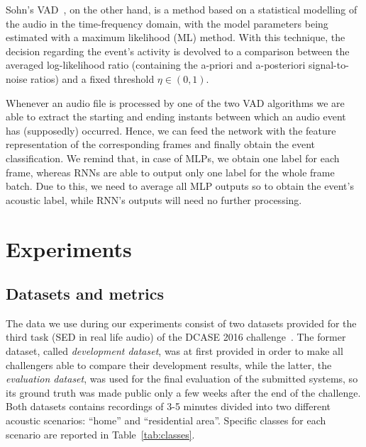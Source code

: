Sohn's VAD~\cite{sohn1999statistical}, on the other hand, is a method based on a statistical modelling of the audio in the time-frequency domain, with the model parameters being estimated with a maximum likelihood (ML) method. With this technique, the decision regarding the event's activity is devolved to a comparison between the averaged log-likelihood ratio (containing the a-priori and a-posteriori signal-to-noise ratios) and a fixed threshold $\eta \in (0,1)$. 

Whenever an audio file is processed by one of the two VAD algorithms we are able to extract the starting and ending instants between which an audio event has (supposedly) occurred. Hence, we can feed the network with the feature representation of the corresponding frames and finally obtain the event classification. We remind that, in case of MLPs, we obtain one label for each frame, whereas RNNs are able to output only one label for the whole frame batch. Due to this, we need to average all MLP outputs so to obtain the event's acoustic label, while RNN's outputs will need no further processing.

\section{Experiments}
\label{sec:eval}

\subsection{Datasets and metrics}

The data we use during our experiments consist of two datasets provided for the third task (SED in real life audio) of the DCASE 2016 challenge~\cite{mesaros2016tut}. The former dataset, called \emph{development dataset}, was at first provided in order to make all challengers able to compare their development results, while the latter, the \emph{evaluation dataset}, was used for the final evaluation of the submitted systems, so its ground truth was made public only a few weeks after the end of the challenge. Both datasets contains recordings of 3-5 minutes divided into two different acoustic scenarios: ``home'' and ``residential area''. Specific classes for each scenario are reported in Table~\ref{tab:classes}. 

